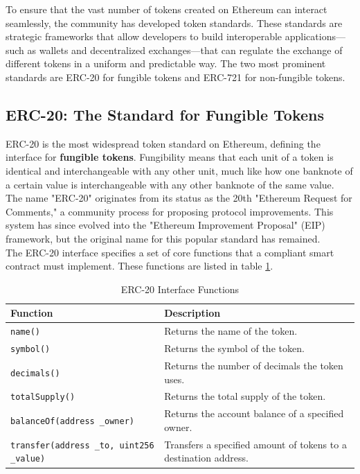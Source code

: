 \documentclass{scrbook}
\begin{document}
To ensure that the vast number of tokens created on Ethereum can interact seamlessly, the community has developed token standards. These standards are strategic frameworks that allow developers to build interoperable applications—such as wallets and decentralized exchanges—that can regulate the exchange of different tokens in a uniform and predictable way. The two most prominent standards are ERC-20 for fungible tokens and ERC-721 for non-fungible tokens.

\subsection{ERC-20: The Standard for Fungible Tokens}

ERC-20 is the most widespread token standard on Ethereum, defining the interface for \textbf{fungible tokens}. Fungibility means that each unit of a token is identical and interchangeable with any other unit, much like how one banknote of a certain value is interchangeable with any other banknote of the same value. \\

The name "ERC-20" originates from its status as the 20th "Ethereum Request for Comments," a community process for proposing protocol improvements. This system has since evolved into the "Ethereum Improvement Proposal" (EIP) framework, but the original name for this popular standard has remained.\\

The ERC-20 interface specifies a set of core functions that a compliant smart contract must implement. These functions are listed in table \ref{tbl:erc20_interface_functions}.

\begin{table}[h]
    \centering
    \begin{tabularx}{\linewidth}{|p{20em}|X|}
    \hline
    \textbf{Function} & \textbf{Description} \\
    \hline
    \texttt{name()} & Returns the name of the token. \\
    \hline
    \texttt{symbol()} & Returns the symbol of the token. \\
    \hline
    \texttt{decimals()} & Returns the number of decimals the token uses. \\
    \hline
    \texttt{totalSupply()} & Returns the total supply of the token. \\
    \hline
    \texttt{balanceOf(address \_owner)} & Returns the account balance of a specified owner. \\
    \hline
    \texttt{transfer(address \_to, uint256 \_value)} & Transfers a specified amount of tokens to a destination address. \\
    \hline
    \end{tabularx}
    \caption{ERC-20 Interface Functions}
    \label{tbl:erc20_interface_functions}
\end{table}
\end{document}
